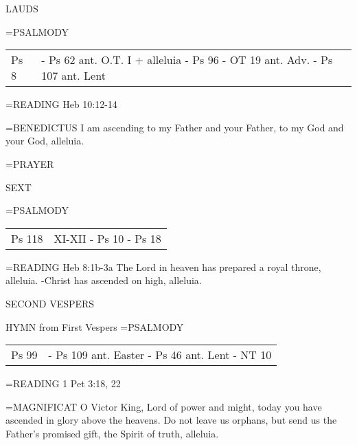 \begin{flushleft}\normalsize LAUDS\\\end{flushleft}
\hangindent=\parindent \small{PSALMODY}
\begin{center}
\begin{tabular}{ l l }
Ps 8 &  - Ps 62 ant. O.T. I + alleluia - Ps 96 - OT 19 ant. Adv. - Ps 107 ant. Lent\\
\end{tabular}
\end{center}		

\hangindent=\parindent \small{READING}    Heb 10:12-14 \textbf{   \\}

\hangindent=\parindent \small{BENEDICTUS 	I am ascending to my Father and your Father, to my God and your God, alleluia.\\}

\hangindent=\parindent \small{PRAYER 	}

\begin{flushleft}\normalsize SEXT\\\end{flushleft}
\hangindent=\parindent \small{PSALMODY}
\begin{center}
\begin{tabular}{ l l }
Ps 118 &  XI-XII - Ps 10 - Ps 18\\
\end{tabular}
\end{center}		

\hangindent=\parindent \small{READING}    Heb 8:1b-3a \textbf{   }
The Lord in heaven has prepared a royal throne, alleluia.
-Christ has ascended on high, alleluia.

\begin{flushleft}\normalsize SECOND VESPERS\\\end{flushleft}
HYMN from First Vespers
\hangindent=\parindent \small{PSALMODY}
\begin{center}
\begin{tabular}{ l l }
Ps 99 &  - Ps 109 ant. Easter - Ps 46 ant. Lent - NT 10\\
\end{tabular}
\end{center}		

\hangindent=\parindent \small{READING}    1 Pet 3:18, 22 \textbf{   \\}

\hangindent=\parindent \small{MAGNIFICAT 	O Victor King, Lord of power and might, today you have ascended in glory above the heavens. Do not leave us orphans, but send us the Father's promised gift, the Spirit of truth, alleluia.\\}

